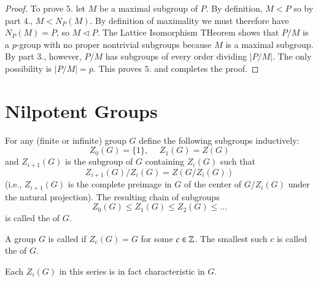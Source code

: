 \documentclass[12pt, a4paper, oneside, openright, titlepage]{book}
\begin{document}
\begin{proof}
    To prove $5.$ let $M$ be a maximal subgroup of $P$. By definition, $M < P$ so by part $4.$, $M < N_P(M)$. By definition of maximality we must therefore have $N_P(M) = P$, so $M \triangleleft P$. The Lattice Isomorphism THeorem shows that $P/M$ is a $p$-group with no proper nontrivial subgroups because $M$ is a maximal subgroup. By part $3.$, however, $P/M$ has subgroups of every order dividing $|P/M|$. The only possibility is $|P/M| = p$. This proves $5.$ and completes the proof.
\end{proof}


\section{\textsection Nilpotent Groups}

\begin{defn}
    For any (finite or infinite) group $G$ define the following subgroups inductively: \begin{equation*}
        Z_0(G) = \{1\}, \hspace{15pt} Z_1(G) = Z(G)
    \end{equation*}
    and $Z_{i+1}(G)$ is the subgroup of $G$ containing $Z_i(G)$ such that \begin{equation*}
        Z_{i+1}(G)/Z_i(G) = Z(G/Z_i(G))
    \end{equation*}
    (i.e., $Z_{i+1}(G)$ is the complete preimage in $G$ of the center of $G/Z_i(G)$ under the natural projection). The resulting chain of subgroups \begin{equation*}
        Z_0(G) \leq Z_1(G) \leq Z_2(G) \leq ...
    \end{equation*}
    is called the  of $G$.
\end{defn}


\begin{defn}
    A group $G$ is called  if $Z_c(G) = G$ for some $c \in \mathbb Z$. The smallest such $c$ is called the  of $G$.
\end{defn}


Each $Z_i(G)$ in this series is in fact characteristic in $G$.
\end{document}

